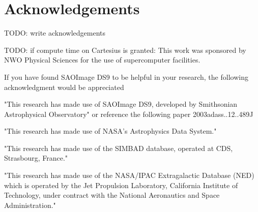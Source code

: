 \documentclass[MScProj_TLRH_ClusterEnergy.tex]{subfiles}
\begin{document}
\chapter*{Acknowledgements}


TODO: write acknowledgements


TODO: if compute time on Cartesius is granted: This work was sponsored by NWO Physical Sciences for the use of supercomputer facilities.

If you have found SAOImage DS9 to be helpful in your research,
        the following acknowledgment would be appreciated




"This research has made use of SAOImage DS9, developed by
            Smithsonian Astrophysical Observatory"
or reference the following paper 2003adass..12..489J


"This research has made use of NASA's Astrophysics Data System."


"This research has made use of the SIMBAD database, operated at CDS, Strasbourg, France." 


"This research has made use of the NASA/IPAC Extragalactic Database (NED) which is operated by the Jet Propulsion Laboratory, California Institute of Technology, under contract with the National Aeronautics and Space Administration."
\end{document}
